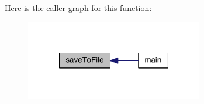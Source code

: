 Here is the caller graph for this function\+:\nopagebreak
\begin{figure}[H]
\begin{center}
\leavevmode
\includegraphics[width=220pt]{a00068_acac21f7e718db9d00451e3caaaacc25f_icgraph}
\end{center}
\end{figure}


